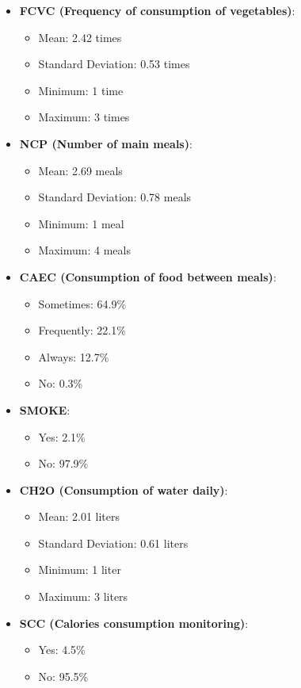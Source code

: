 \documentclass[conference]{IEEEtran}
\begin{document}
\begin{itemize}
    \item \textbf{FCVC (Frequency of consumption of vegetables)}:
    \begin{itemize}
        \item Mean: 2.42 times
        \item Standard Deviation: 0.53 times
        \item Minimum: 1 time
        \item Maximum: 3 times
    \end{itemize}
    
    \item \textbf{NCP (Number of main meals)}:
    \begin{itemize}
        \item Mean: 2.69 meals
        \item Standard Deviation: 0.78 meals
        \item Minimum: 1 meal
        \item Maximum: 4 meals
    \end{itemize}
    
    \item \textbf{CAEC (Consumption of food between meals)}:
    \begin{itemize}
        \item Sometimes: 64.9\%
        \item Frequently: 22.1\%
        \item Always: 12.7\%
        \item No: 0.3\%
    \end{itemize}
    
    \item \textbf{SMOKE}:
    \begin{itemize}
        \item Yes: 2.1\%
        \item No: 97.9\%
    \end{itemize}
    
    \item \textbf{CH2O (Consumption of water daily)}:
    \begin{itemize}
        \item Mean: 2.01 liters
        \item Standard Deviation: 0.61 liters
        \item Minimum: 1 liter
        \item Maximum: 3 liters
    \end{itemize}
    
    \item \textbf{SCC (Calories consumption monitoring)}:
    \begin{itemize}
        \item Yes: 4.5\%
        \item No: 95.5\%
    \end{itemize}
    

\end{itemize}
\end{document}
